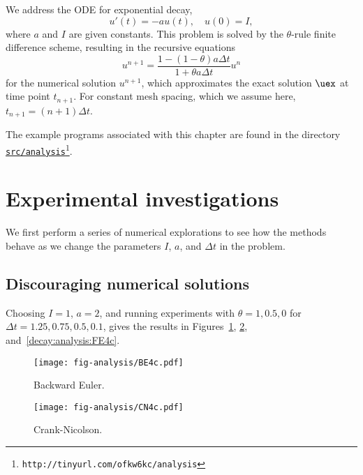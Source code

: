 \documentclass[graybox,sectrefs,envcountresetchap,open=right,final]{svmonodo}
\begin{document}
We address the ODE for exponential decay,
\begin{equation}
u'(t) = -au(t),\quad u(0)=I,
\end{equation}
where $a$ and $I$ are given constants. This problem is solved
by the $\theta$-rule finite difference scheme, resulting in
the recursive equations
\begin{equation}
u^{n+1} = \frac{1 - (1-\theta) a\Delta t}{1 + \theta a\Delta t}u^n
\label{decay:analysis:scheme}
\end{equation}
for the numerical solution $u^{n+1}$, which approximates the exact
solution $\uex$ at time point $t_{n+1}$. For constant mesh spacing,
which we assume here, $t_{n+1}=(n+1)\Delta t$.

The example programs associated with this chapter are found in
the directory \href{{http://tinyurl.com/ofkw6kc/analysis}}{\nolinkurl{src/analysis}\footnote{\texttt{http://tinyurl.com/ofkw6kc/analysis}}}.

\section{Experimental investigations}

We first perform a series of numerical explorations to see how the
methods behave as we change the parameters $I$, $a$, and $\Delta t$
in the problem.

\subsection{Discouraging numerical solutions}

Choosing $I=1$, $a=2$, and running experiments with $\theta =1,0.5, 0$
for $\Delta t=1.25, 0.75, 0.5, 0.1$, gives the results in
Figures~\ref{decay:analysis:BE4c}, \ref{decay:analysis:CN4c}, and~\ref{decay:analysis:FE4c}.


\begin{figure}[!ht]  %
  \centerline{\texttt{[image: fig-analysis/BE4c.pdf]}}
  \caption{
  Backward Euler. \label{decay:analysis:BE4c}
  }
\end{figure}



\begin{figure}[!ht]  %
  \centerline{\texttt{[image: fig-analysis/CN4c.pdf]}}
  \caption{
  Crank-Nicolson. \label{decay:analysis:CN4c}
  }
\end{figure}
\end{document}
